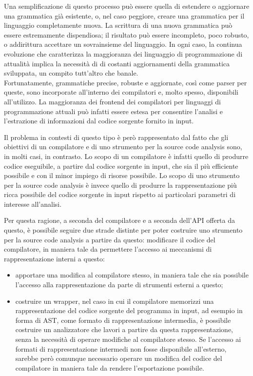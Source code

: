 Una semplificazione di questo processo può essere quella di estendere o
aggiornare una grammatica già esistente, o, nel caso peggiore, creare una
grammatica per il linguaggio completamente nuova. La scrittura di una nuova
grammatica può essere estremamente dispendiosa; il risultato può essere
incompleto, poco robusto, o addirittura accettare un sovrainsieme del
linguaggio. In ogni caso, la continua evoluzione che caratterizza la
maggioranza dei linguaggio di programmazione di attualità implica la necessità
di di costanti aggiornamenti della grammatica sviluppata, un compito tutt’altro
che banale.\\

Fortunatamente, grammatiche precise, robuste e aggiornate, così come parser per
queste, sono incorporate all’interno dei compilatori e, molto spesso,
disponibili all’utilizzo. La maggioranza dei frontend dei compilatori per
linguaggi di programmazione attuali può infatti essere estesa per consentire
l’analisi e l’estrazione di informazioni dal codice sorgente fornito in input.

Il problema in contesti di questo tipo è
però rappresentato dal fatto che gli obiettivi di un compilatore e di uno
strumento per la source code analysis sono, in molti casi, in contrasto. Lo
scopo di un compilatore è infatti quello di produrre codice eseguibile, a
partire dal codice sorgente in input, che sia il più efficiente possibile e con
il minor impiego di risorse possibile. Lo scopo di uno strumento per la source
code analysis è invece quello di produrre la rappresentazione più ricca
possibile del codice sorgente in input rispetto ai particolari parametri di
interesse all’analisi.

Per questa ragione, a seconda del compilatore e a
seconda dell’API offerta da questo, è possibile seguire due strade distinte per
poter costruire uno strumento per la source code analysis a partire da questo:
modificare il codice del compilatore, in maniera tale da permettere l’accesso
ai meccanismi di rappresentazione interni a questo:

\begin{itemize}

\item apportare una modifica al compilatore stesso, in maniera tale che sia
possibile l'accesso alla rappresentazione da parte di strumenti esterni a
questo;

\item costruire un wrapper, nel caso in cui il compilatore memorizzi una
rappresentazione del codice sorgente del programma in input, ad esempio in
forma di AST, come formato di rappresentazione intermedia, è possibile
costruire un analizzatore che lavori a partire da questa rappresentazione,
senza la necessità di operare modifiche al compilatore stesso. Se l’accesso ai
formati di rappresentazione intermedi non fosse disponibile all’esterno,
sarebbe però comunque necessario operare un modifica del codice del compilatore
in maniera tale da rendere l’esportazione possibile.

\end{itemize}


